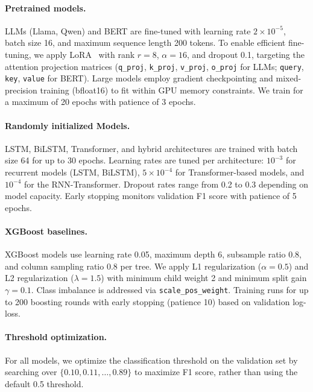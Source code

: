 \documentclass{article}
\theoremstyle{plain}
\theoremstyle{definition}
\theoremstyle{remark}
\begin{document}
\paragraph{Pretrained models.}
LLMs (Llama, Qwen) and BERT are fine-tuned with learning rate $2 \times 10^{-5}$, batch size 16, and maximum sequence length 200 tokens. To enable efficient fine-tuning, we apply LoRA~\citep{LoRA} with rank $r=8$, $\alpha=16$, and dropout 0.1, targeting the attention projection matrices (\texttt{q\_proj}, \texttt{k\_proj}, \texttt{v\_proj}, \texttt{o\_proj} for LLMs; \texttt{query}, \texttt{key}, \texttt{value} for BERT). Large models employ gradient checkpointing and mixed-precision training (bfloat16) to fit within GPU memory constraints. We train for a maximum of 20 epochs with patience of 3 epochs.

\paragraph{Randomly initialized Models.}
LSTM, BiLSTM, Transformer, and hybrid architectures are trained with batch size 64 for up to 30 epochs. Learning rates are tuned per architecture: $10^{-3}$ for recurrent models (LSTM, BiLSTM), $5 \times 10^{-4}$ for Transformer-based models, and $10^{-4}$ for the RNN-Transformer. Dropout rates range from 0.2 to 0.3 depending on model capacity. Early stopping monitors validation F1 score with patience of 5 epochs.

\paragraph{XGBoost baselines.}
XGBoost models use learning rate 0.05, maximum depth 6, subsample ratio 0.8, and column sampling ratio 0.8 per tree. We apply L1 regularization ($\alpha=0.5$) and L2 regularization ($\lambda=1.5$) with minimum child weight 2 and minimum split gain $\gamma=0.1$. Class imbalance is addressed via \texttt{scale\_pos\_weight}. Training runs for up to 200 boosting rounds with early stopping (patience 10) based on validation log-loss.

\paragraph{Threshold optimization.}
For all models, we optimize the classification threshold on the validation set by searching over $\{0.10, 0.11, \ldots, 0.89\}$ to maximize F1 score, rather than using the default 0.5 threshold.
\end{document}
